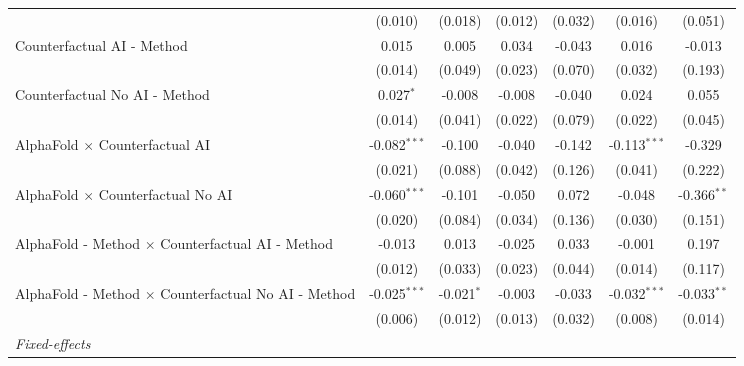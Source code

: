 \begin{tabular}{lcccccc}
                                                              & (0.010)        & (0.018)       & (0.012)       & (0.032)      & (0.016)        & (0.051)\\   
   Counterfactual AI - Method                                 & 0.015          & 0.005         & 0.034         & -0.043       & 0.016          & -0.013\\   
                                                              & (0.014)        & (0.049)       & (0.023)       & (0.070)      & (0.032)        & (0.193)\\   
   Counterfactual No AI - Method                              & 0.027$^{*}$    & -0.008        & -0.008        & -0.040       & 0.024          & 0.055\\   
                                                              & (0.014)        & (0.041)       & (0.022)       & (0.079)      & (0.022)        & (0.045)\\   
   AlphaFold $\times$ Counterfactual AI                       & -0.082$^{***}$ & -0.100        & -0.040        & -0.142       & -0.113$^{***}$ & -0.329\\   
                                                              & (0.021)        & (0.088)       & (0.042)       & (0.126)      & (0.041)        & (0.222)\\   
   AlphaFold $\times$ Counterfactual No AI                    & -0.060$^{***}$ & -0.101        & -0.050        & 0.072        & -0.048         & -0.366$^{**}$\\   
                                                              & (0.020)        & (0.084)       & (0.034)       & (0.136)      & (0.030)        & (0.151)\\   
   AlphaFold - Method $\times$ Counterfactual AI - Method     & -0.013         & 0.013         & -0.025        & 0.033        & -0.001         & 0.197\\   
                                                              & (0.012)        & (0.033)       & (0.023)       & (0.044)      & (0.014)        & (0.117)\\   
   AlphaFold - Method $\times$ Counterfactual No AI - Method  & -0.025$^{***}$ & -0.021$^{*}$  & -0.003        & -0.033       & -0.032$^{***}$ & -0.033$^{**}$\\   
                                                              & (0.006)        & (0.012)       & (0.013)       & (0.032)      & (0.008)        & (0.014)\\   
   \midrule
   \emph{Fixed-effects}\\

\end{tabular}
